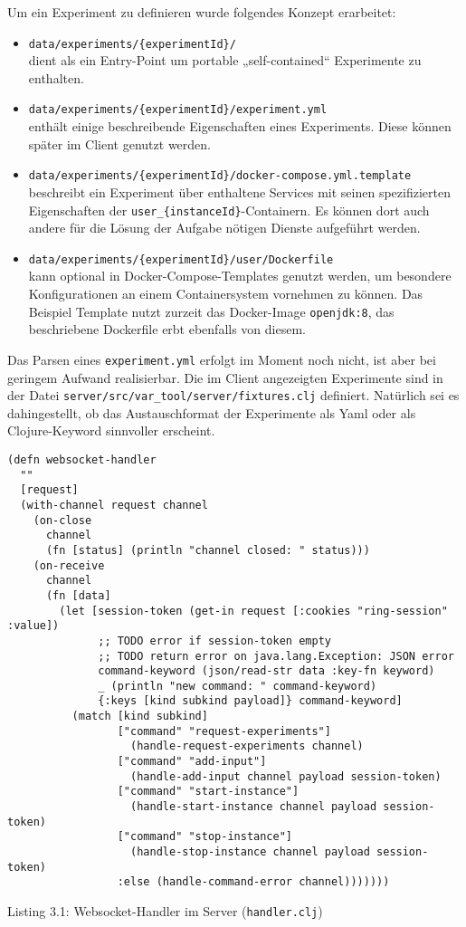 Um ein Experiment zu definieren wurde folgendes Konzept erarbeitet:
\begin{itemize}
  \item \texttt{data/experiments/\{experimentId\}/} \\dient als ein Entry-Point um portable „self-contained“ Experimente zu enthalten.
  \item \texttt{data/experiments/\{experimentId\}/experiment.yml} \\enthält einige beschreibende Eigenschaften eines Experiments.
    Diese können später im Client genutzt werden.
  \item \texttt{data/experiments/\{experimentId\}/docker-compose.yml.template} \\beschreibt ein Experiment über enthaltene Services mit seinen spezifizierten Eigenschaften der \texttt{user\_\{instanceId\}}-Containern.
    Es können dort auch andere für die Lösung der Aufgabe nötigen Dienste aufgeführt werden.
  \item \texttt{data/experiments/\{experimentId\}/user/Dockerfile} \\kann optional in Docker-Compose-Templates genutzt werden, um besondere Konfigurationen an einem Containersystem vornehmen zu können.
    Das Beispiel Template nutzt zurzeit das Docker-Image \texttt{openjdk:8}, das beschriebene Dockerfile erbt ebenfalls von diesem.
  \end{itemize}
  Das Parsen eines \texttt{experiment.yml} erfolgt im Moment noch nicht, ist aber bei geringem Aufwand realisierbar.
  Die im Client angezeigten Experimente sind in der Datei \texttt{server/src/var\_tool/server/fixtures.clj} definiert.
  Natürlich sei es dahingestellt, ob das Austauschformat der Experimente als Yaml oder als Clojure-Keyword sinnvoller erscheint.

\clearpage
\begin{verbatim}
(defn websocket-handler
  ""
  [request]
  (with-channel request channel
    (on-close
      channel
      (fn [status] (println "channel closed: " status)))
    (on-receive
      channel
      (fn [data]
        (let [session-token (get-in request [:cookies "ring-session" :value])
              ;; TODO error if session-token empty
              ;; TODO return error on java.lang.Exception: JSON error
              command-keyword (json/read-str data :key-fn keyword)
              _ (println "new command: " command-keyword)
              {:keys [kind subkind payload]} command-keyword]
          (match [kind subkind]
                 ["command" "request-experiments"]
                   (handle-request-experiments channel)
                 ["command" "add-input"]
                   (handle-add-input channel payload session-token)
                 ["command" "start-instance"]
                   (handle-start-instance channel payload session-token)
                 ["command" "stop-instance"]
                   (handle-stop-instance channel payload session-token)
                 :else (handle-command-error channel)))))))
\end{verbatim}
\begin{center}
  Listing 3.1: Websocket-Handler im Server (\texttt{handler.clj})
\end{center}
\clearpage

